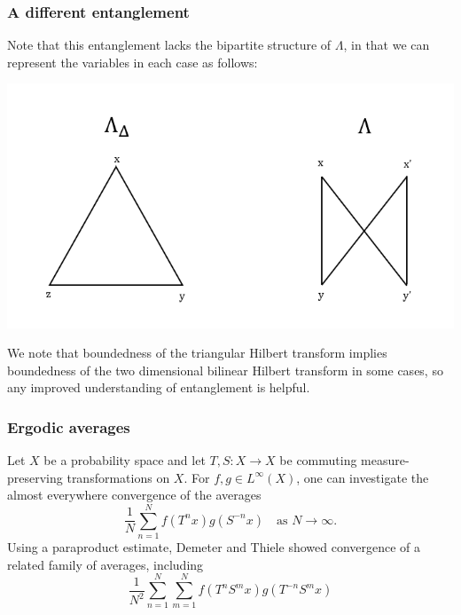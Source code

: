 \documentclass[usenames,dvipsnames,12pt]{beamer}
\begin{document}
\begin{frame}
\frametitle{A different entanglement}
Note that this entanglement lacks the bipartite structure of $\Lambda$, in that we can represent the variables in each case as follows:
\pause
\begin{center}
\includegraphics[scale=0.4]{GraphEntanglement.png}
\end{center}
\pause
We note that boundedness of the triangular Hilbert transform implies boundedness of the two dimensional bilinear Hilbert transform in some cases, so any improved understanding of entanglement is helpful.
\end{frame}



\begin{frame}
\frametitle{Ergodic averages}

Let $X$ be a probability space and let $T, S: X \to X$ be commuting measure-preserving transformations on $X$. For $f,g \in L^\infty(X)$, one can investigate the almost everywhere convergence of the averages
%
\begin{equation*}
\dfrac{1}{N}\sum\limits_{n=1}^{N}f(T^n x)g(S^{-n} x) \quad\text{as $N \to \infty$.}
\end{equation*}
%
\pause
Using a paraproduct estimate, Demeter and Thiele showed convergence of a related family of averages, including
%
\begin{equation}\label{jdjfergodic2}
\dfrac{1}{N^2}\sum\limits_{n=1}^{N}\sum\limits_{m=1}^{N}f(T^nS^m x)g(T^{-n}S^m x)
\end{equation}
\end{frame}
\end{document}
